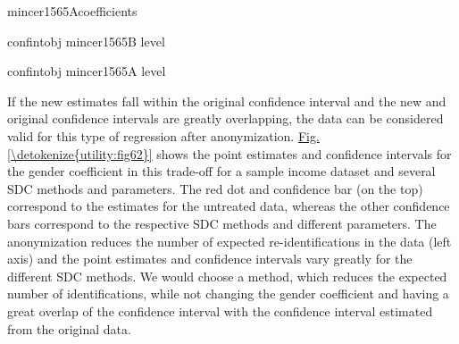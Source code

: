 \documentclass[letterpaper,10pt,english]{sphinxmanual}
\begin{document}
\begin{sphinxVerbatim}[commandchars=\\\{\},numbers=left,firstnumber=1,stepnumber=1]
mincer1565Acoefficients 

confintobj  mincer1565B level   

confintobj  mincer1565A level   
\end{sphinxVerbatim}

If the new estimates fall within the original confidence interval and
the new and original confidence intervals are greatly overlapping, the
data can be considered valid for this type of regression after
anonymization. \hyperref[\detokenize{utility:fig62}]{Fig.\@ \ref{\detokenize{utility:fig62}}} shows the point estimates and confidence
intervals for the gender coefficient in this trade-off for a sample
income dataset and several SDC methods and parameters. The red dot and
confidence bar (on the top) correspond to the estimates for the
untreated data, whereas the other confidence bars correspond to the
respective SDC methods and different parameters. The anonymization
reduces the number of expected re-identifications in the data (left
axis) and the point estimates and confidence intervals vary greatly for
the different SDC methods. We would choose a method, which reduces the
expected number of identifications, while not changing the gender
coefficient and having a great overlap of the confidence interval with
the confidence interval estimated from the original data.
\end{document}
